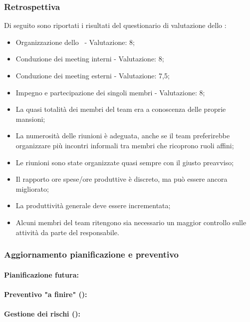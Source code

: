 \subsubsection{Retrospettiva}

\par Di seguito sono riportati i risultati del questionario di valutazione dello :
\begin{itemize}
  \item Organizzazione dello \ - Valutazione: 8;
  \item Conduzione dei meeting interni - Valutazione: 8;
  \item Conduzione dei meeting esterni - Valutazione: 7,5;
  \item Impegno e partecipazione dei singoli membri - Valutazione: 8;
  \item La quasi totalità dei membri del team era a conoscenza delle proprie mansioni;
  \item La numerosità delle riunioni è adeguata, anche se il team preferirebbe organizzare più incontri informali tra membri che ricoprono ruoli affini;
  \item Le riunioni sono state organizzate quasi sempre con il giusto preavviso;
  \item Il rapporto ore spese/ore produttive è discreto, ma può essere ancora migliorato;
  \item La produttività generale deve essere incrementata;
  \item Alcuni membri del team ritengono sia necessario un maggior controllo sulle attività da parte del responsabile.
\end{itemize}

\subsubsection{Aggiornamento pianificazione e preventivo}

\paragraph*{Pianificazione futura:}

\paragraph*{Preventivo "a finire" ():}

\paragraph*{Gestione dei rischi ():}

